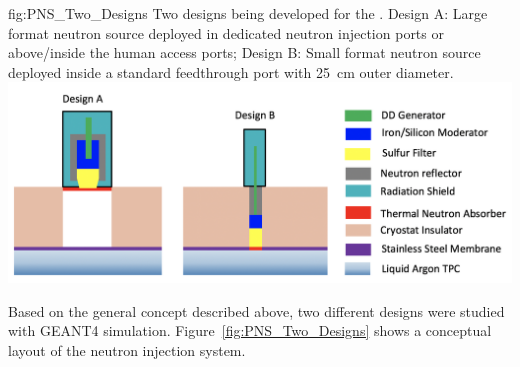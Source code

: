 \begin{dunefigure}{fig:PNS_Two_Designs}
{Two designs being developed for the . Design A: Large format neutron source deployed in dedicated neutron injection ports or above/inside the human access ports; Design B: Small format neutron source deployed inside a standard feedthrough port with \SI{25}{\cm} outer diameter.}
\includegraphics[width=16cm]{graphics/PNS_Two_Designs.png}
\end{dunefigure}

Based on the general concept described above, two different designs were studied with GEANT4 simulation. Figure~\ref{fig:PNS_Two_Designs} shows a conceptual layout of the neutron injection system. %

